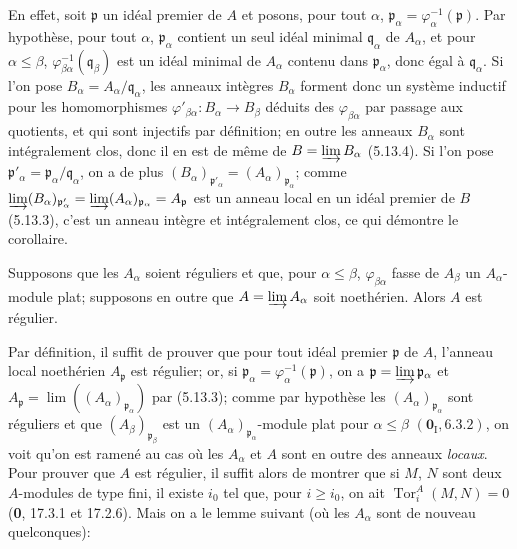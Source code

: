 En effet, soit $\mathfrak p$ un idéal premier de $A$ et posons, pour tout
$\alpha$, $\mathfrak p_\alpha=\varphi_\alpha^{-1}(\mathfrak p)$. Par
hypothèse, pour tout $\alpha$, $\mathfrak p_\alpha$ contient un seul idéal
minimal $\mathfrak q_\alpha$ de $A_\alpha$, et pour $\alpha\leq\beta$,
$\varphi_{\beta\alpha}^{-1}(\mathfrak q_\beta)$ est un idéal minimal de
$A_\alpha$ contenu dans $\mathfrak p_\alpha$, donc égal à
$\mathfrak q_\alpha$. Si l'on pose
$B_\alpha=A_\alpha/\mathfrak q_\alpha$, les anneaux intègres $B_\alpha$
forment donc un système inductif pour les homomorphismes
$\varphi'_{\beta\alpha}:B_\alpha\to B_\beta$ déduits des
$\varphi_{\beta\alpha}$ par passage aux quotients, et qui sont injectifs par
définition; en outre les anneaux $B_\alpha$ sont intégralement clos, donc il en
est de même de $B=\varinjlim B_\alpha$ (5.13.4). Si l'on pose
$\mathfrak p'_\alpha=\mathfrak p_\alpha/\mathfrak q_\alpha$, on a de plus
$(B_\alpha)_{\mathfrak p'_\alpha}=(A_\alpha)_{\mathfrak p_\alpha}$; comme
$\varinjlim(B_\alpha)_{\mathfrak p'_\alpha}
=\varinjlim(A_\alpha)_{\mathfrak p_\alpha}=A_{\mathfrak p}$
est un anneau local en un idéal premier de $B$ (5.13.3), c'est un anneau
intègre et intégralement clos, ce qui démontre le corollaire.

\begin{proposition}[5.13.7]
\label{IV.2.s5.13.7-fr}
Supposons que les $A_\alpha$ soient réguliers et que, pour
$\alpha\leq\beta$, $\varphi_{\beta\alpha}$ fasse de $A_\beta$ un
$A_\alpha$-module plat; supposons en outre que
$A=\varinjlim A_\alpha$ soit noethérien. Alors $A$ est régulier.
\end{proposition}

Par définition, il suffit de prouver que pour tout idéal premier $\mathfrak p$
de $A$, l'anneau local noethérien $A_{\mathfrak p}$ est régulier; or, si
$\mathfrak p_\alpha=\varphi_\alpha^{-1}(\mathfrak p)$, on a
$\mathfrak p=\varinjlim\mathfrak p_\alpha$ et
$A_{\mathfrak p}=\lim((A_\alpha)_{\mathfrak p_\alpha})$ par (5.13.3);
comme par hypothèse les $(A_\alpha)_{\mathfrak p_\alpha}$ sont réguliers et
que $(A_\beta)_{\mathfrak p_\beta}$ est un
$(A_\alpha)_{\mathfrak p_\alpha}$-module plat pour $\alpha\leq\beta$
$(\mathbf{0}_{\mathrm I}, 6.3.2)$, on voit qu'on est ramené au cas où les $A_\alpha$ et
$A$ sont en outre des anneaux \emph{locaux}. Pour prouver que $A$ est régulier, il
suffit alors de montrer que si $M$, $N$ sont deux $A$-modules de type fini, il
existe $i_0$ tel que, pour $i\geq i_0$,
on ait $\operatorname{Tor}^A_i(M,N)=0$ (\textbf{0}, 17.3.1 et 17.2.6). Mais on a le
lemme suivant (où les $A_\alpha$ sont de nouveau quelconques):

